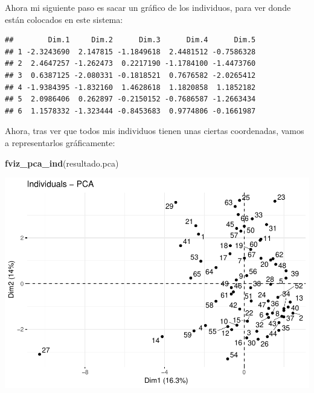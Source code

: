 \documentclass[]{article}
\newenvironment{Shaded}{\begin{snugshade}}{\end{snugshade}}
\newcommand{\KeywordTok}[1]{\textcolor[rgb]{0.13,0.29,0.53}{\textbf{#1}}}
\newcommand{\CommentTok}[1]{\textcolor[rgb]{0.56,0.35,0.01}{\textit{#1}}}
\newcommand{\OperatorTok}[1]{\textcolor[rgb]{0.81,0.36,0.00}{\textbf{#1}}}
\newcommand{\NormalTok}[1]{#1}
\begin{document}
Ahora mi siguiente paso es sacar un gráfico de los individuos, para ver
donde están colocados en este sistema:

\begin{Shaded}
\end{Shaded}

\begin{verbatim}
##        Dim.1     Dim.2      Dim.3      Dim.4      Dim.5
## 1 -2.3243690  2.147815 -1.1849618  2.4481512 -0.7586328
## 2  2.4647257 -1.262473  0.2217190 -1.1784100 -1.4473760
## 3  0.6387125 -2.080331 -0.1818521  0.7676582 -2.0265412
## 4 -1.9384395 -1.832160  1.4628618  1.1820858  1.1852182
## 5  2.0986406  0.262897 -0.2150152 -0.7686587 -1.2663434
## 6  1.1578332 -1.323444 -0.8453683  0.9774806 -0.1661987
\end{verbatim}

Ahora, tras ver que todos mis individuos tienen unas ciertas
coordenadas, vamos a representarlos gráficamente:

\begin{Shaded}
\begin{Highlighting}[]
\KeywordTok{fviz_pca_ind}\NormalTok{(resultado.pca)}
\end{Highlighting}
\end{Shaded}

\includegraphics{codigo_files/figure-latex/plot_coordendas_individuos-1.pdf}
\end{document}
